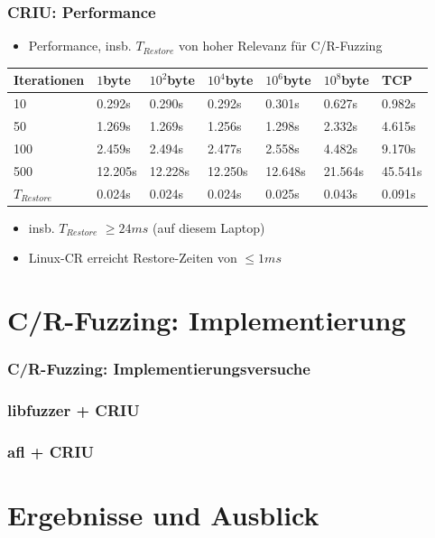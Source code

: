 \documentclass[handout]{beamer}
\begin{document}
\begin{frame}
    \frametitle{CRIU: Performance}
    \begin{itemize}
        \item Performance, insb. $T_{Restore}$ von hoher Relevanz für C/R-Fuzzing
    \end{itemize}

\begin{tabular}{| l | l  l  l  l  l | l |}
    \toprule
    Iterationen & $1$byte & $10^2$byte & $10^4$byte & $10^6$byte & $10^8$byte & TCP \\
    \midrule
    10 & 0.292s & 0.290s & 0.292s & 0.301s & 0.627s & 0.982s \\
    50 & 1.269s & 1.269s & 1.256s & 1.298s & 2.332s & 4.615s \\
    100 & 2.459s & 2.494s & 2.477s & 2.558s & 4.482s & 9.170s \\
    500 & 12.205s & 12.228s & 12.250s & 12.648s & 21.564s & 45.541s \\
    \midrule
    $T_{Restore}$ & 0.024s & 0.024s & 0.024s & 0.025s & 0.043s & 0.091s \\
    \bottomrule
\end{tabular}
    \begin{itemize}
        \item insb. $T_{Restore}$ $\geq 24ms$ (auf diesem Laptop)
        \item Linux-CR erreicht Restore-Zeiten von $\leq 1ms$
    \end{itemize}

\end{frame}

\section{C/R-Fuzzing: Implementierung}
\begin{frame}
    \frametitle{C/R-Fuzzing: Implementierungsversuche}
\end{frame}

\begin{frame}
    \frametitle{libfuzzer + CRIU}
\end{frame}

\begin{frame}
    \frametitle{afl + CRIU}
\end{frame}

\section{Ergebnisse und Ausblick}
\end{document}

